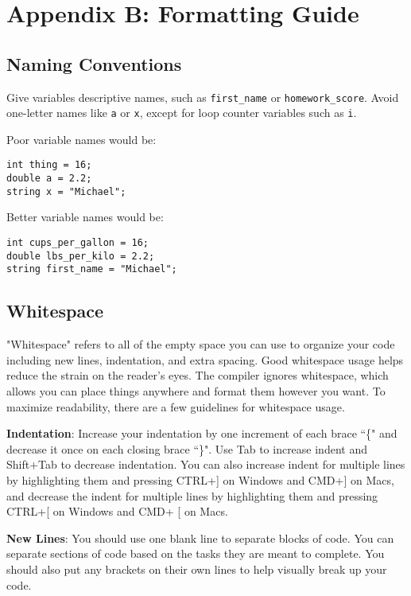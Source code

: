 \chapter*{Appendix B: Formatting Guide}
\setcounter{chapter}{17}
\setcounter{section}{0}

\section{Naming Conventions}
Give variables descriptive names, such as \texttt{first_name} or \texttt{homework_score}. Avoid one-letter names like \texttt{a} or \texttt{x}, except for loop counter variables such as \texttt{i}.

\begin{example}
    Poor variable names would be:
    \begin{verbatim}
int thing = 16;
double a = 2.2;
string x = "Michael";
    \end{verbatim}
    Better variable names would be:
    \begin{verbatim}
int cups_per_gallon = 16;
double lbs_per_kilo = 2.2;
string first_name = "Michael";
    \end{verbatim}
\end{example}


\section{Whitespace}
"Whitespace" refers to all of the empty space you can use to organize your code including new lines, indentation, and extra spacing. Good whitespace usage helps reduce the strain on the reader's eyes. The compiler ignores whitespace, which allows you can place things anywhere and format them however you want. To maximize readability, there are a few guidelines for whitespace usage. 

\textbf{Indentation}: Increase your indentation by one increment of each brace ``\{" and decrease it once on each closing brace ``\}". Use Tab to increase indent and Shift+Tab to decrease indentation. You can also increase indent for multiple lines by highlighting them and pressing CTRL+] on Windows and CMD+] on Macs, and decrease the indent for multiple lines by highlighting them and pressing CTRL+[ on Windows and CMD+ [ on Macs.

\textbf{New Lines}: You should use one blank line to separate blocks of code. You can separate sections of code based on the tasks they are meant to complete. You should also put any brackets on their own lines to help visually break up your code.

